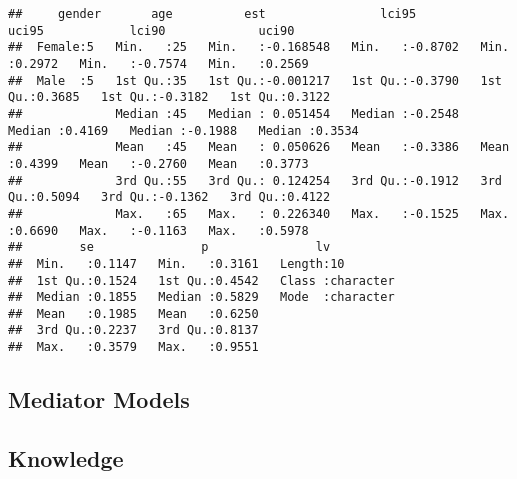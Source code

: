 \documentclass[
]{article}
\begin{document}
\begin{verbatim}
##     gender       age          est                lci95             uci95            lci90             uci90       
##  Female:5   Min.   :25   Min.   :-0.168548   Min.   :-0.8702   Min.   :0.2972   Min.   :-0.7574   Min.   :0.2569  
##  Male  :5   1st Qu.:35   1st Qu.:-0.001217   1st Qu.:-0.3790   1st Qu.:0.3685   1st Qu.:-0.3182   1st Qu.:0.3122  
##             Median :45   Median : 0.051454   Median :-0.2548   Median :0.4169   Median :-0.1988   Median :0.3534  
##             Mean   :45   Mean   : 0.050626   Mean   :-0.3386   Mean   :0.4399   Mean   :-0.2760   Mean   :0.3773  
##             3rd Qu.:55   3rd Qu.: 0.124254   3rd Qu.:-0.1912   3rd Qu.:0.5094   3rd Qu.:-0.1362   3rd Qu.:0.4122  
##             Max.   :65   Max.   : 0.226340   Max.   :-0.1525   Max.   :0.6690   Max.   :-0.1163   Max.   :0.5978  
##        se               p               lv           
##  Min.   :0.1147   Min.   :0.3161   Length:10         
##  1st Qu.:0.1524   1st Qu.:0.4542   Class :character  
##  Median :0.1855   Median :0.5829   Mode  :character  
##  Mean   :0.1985   Mean   :0.6250                     
##  3rd Qu.:0.2237   3rd Qu.:0.8137                     
##  Max.   :0.3579   Max.   :0.9551
\end{verbatim}

\hypertarget{mediator-models-3}{%
\subsection{Mediator Models}\label{mediator-models-3}}

\hypertarget{knowledge-3}{%
\subsection{Knowledge}\label{knowledge-3}}
\end{document}
